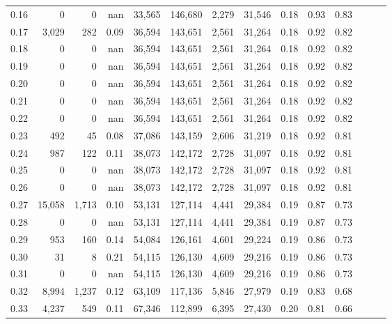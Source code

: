 \begin{tabular}{rrrrrrrrrrrrrr}
0.16 &       0 &      0 &   nan &   33,565 &  146,680 &   2,279 &  31,546 &  0.18 &  0.93 &      0.83 \\
0.17 &   3,029 &    282 &  0.09 &   36,594 &  143,651 &   2,561 &  31,264 &  0.18 &  0.92 &      0.82 \\
0.18 &       0 &      0 &   nan &   36,594 &  143,651 &   2,561 &  31,264 &  0.18 &  0.92 &      0.82 \\
0.19 &       0 &      0 &   nan &   36,594 &  143,651 &   2,561 &  31,264 &  0.18 &  0.92 &      0.82 \\
0.20 &       0 &      0 &   nan &   36,594 &  143,651 &   2,561 &  31,264 &  0.18 &  0.92 &      0.82 \\
0.21 &       0 &      0 &   nan &   36,594 &  143,651 &   2,561 &  31,264 &  0.18 &  0.92 &      0.82 \\
0.22 &       0 &      0 &   nan &   36,594 &  143,651 &   2,561 &  31,264 &  0.18 &  0.92 &      0.82 \\
0.23 &     492 &     45 &  0.08 &   37,086 &  143,159 &   2,606 &  31,219 &  0.18 &  0.92 &      0.81 \\
0.24 &     987 &    122 &  0.11 &   38,073 &  142,172 &   2,728 &  31,097 &  0.18 &  0.92 &      0.81 \\
0.25 &       0 &      0 &   nan &   38,073 &  142,172 &   2,728 &  31,097 &  0.18 &  0.92 &      0.81 \\
0.26 &       0 &      0 &   nan &   38,073 &  142,172 &   2,728 &  31,097 &  0.18 &  0.92 &      0.81 \\
0.27 &  15,058 &  1,713 &  0.10 &   53,131 &  127,114 &   4,441 &  29,384 &  0.19 &  0.87 &      0.73 \\
0.28 &       0 &      0 &   nan &   53,131 &  127,114 &   4,441 &  29,384 &  0.19 &  0.87 &      0.73 \\
0.29 &     953 &    160 &  0.14 &   54,084 &  126,161 &   4,601 &  29,224 &  0.19 &  0.86 &      0.73 \\
0.30 &      31 &      8 &  0.21 &   54,115 &  126,130 &   4,609 &  29,216 &  0.19 &  0.86 &      0.73 \\
0.31 &       0 &      0 &   nan &   54,115 &  126,130 &   4,609 &  29,216 &  0.19 &  0.86 &      0.73 \\
0.32 &   8,994 &  1,237 &  0.12 &   63,109 &  117,136 &   5,846 &  27,979 &  0.19 &  0.83 &      0.68 \\
0.33 &   4,237 &    549 &  0.11 &   67,346 &  112,899 &   6,395 &  27,430 &  0.20 &  0.81 &      0.66 \\

\end{tabular}
